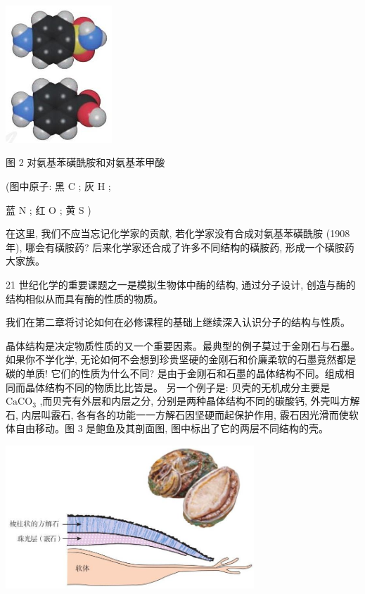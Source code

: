 \documentclass[10pt]{article}
\begin{document}
\begin{center}
\includegraphics[max width=0.3\textwidth]{images/0190e026-5a11-7df7-bd27-54d09026ba7a_6_624545.jpg}
\end{center}

图 2 对氨基苯磺酰胺和对氨基苯甲酸

(图中原子: 黑 \(\mathrm{C}\) ; 灰 \(\mathrm{H}\) ;

蓝 \(\mathrm{N}\) ; 红 \(\mathrm{O}\) ; 黄 \(\mathrm{S}\) )

在这里, 我们不应当忘记化学家的贡献, 若化学家没有合成对氨基苯磺酰胺 (1908 年), 哪会有磺胺药? 后来化学家还合成了许多不同结构的磺胺药, 形成一个磺胺药大家族。

21 世纪化学的重要课题之一是模拟生物体中酶的结构, 通过分子设计, 创造与酶的结构相似从而具有酶的性质的物质。

我们在第二章将讨论如何在必修课程的基础上继续深入认识分子的结构与性质。

晶体结构是决定物质性质的又一个重要因素。最典型的例子莫过于金刚石与石墨。如果你不学化学, 无论如何不会想到珍贵坚硬的金刚石和价廉柔软的石墨竟然都是碳的单质! 它们的性质为什么不同? 是由于金刚石和石墨的晶体结构不同。组成相同而晶体结构不同的物质比比皆是。 另一个例子是: 贝壳的无机成分主要是 \({\mathrm{{CaCO}}}_{3}\) ,而贝壳有外层和内层之分, 分别是两种晶体结构不同的碳酸钙, 外壳叫方解石, 内层叫霰石, 各有各的功能一一方解石因坚硬而起保护作用, 霰石因光滑而使软体自由移动。图 3 是鲍鱼及其剖面图, 图中标出了它的两层不同结构的壳。

\begin{center}
\includegraphics[max width=0.7\textwidth]{images/0190e026-5a11-7df7-bd27-54d09026ba7a_7_466466.jpg}
\end{center}
\end{document}
